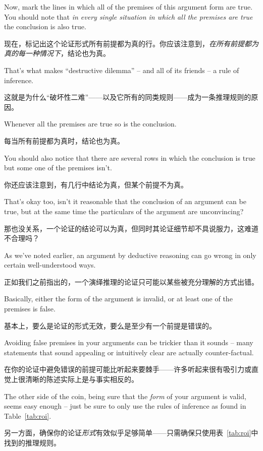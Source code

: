 Now, mark the lines in which all of the premises of this argument form 
are true.  You should note that {\em in every single situation in which 
all the premises are true} the conclusion is also true.

现在，标记出这个论证形式所有前提都为真的行。你应该注意到，{\em 在所有前提都为真的每一种情况下}，结论也为真。

That's what 
makes ``destructive dilemma'' -- and all of its friends -- a rule of 
inference.

这就是为什么“破坏性二难”——以及它所有的同类规则——成为一条推理规则的原因。

Whenever all the premises are true so is the conclusion.

每当所有前提都为真时，结论也为真。

You should also notice that there are several rows in which the 
conclusion is true but some one of the premises isn't.

你还应该注意到，有几行中结论为真，但某个前提不为真。

That's
okay too, isn't it reasonable that the conclusion of an argument 
can be true, but at the same time the particulars of the argument 
are unconvincing?

那也没关系，一个论证的结论可以为真，但同时其论证细节却不具说服力，这难道不合理吗？

As we've noted earlier, an argument by deductive reasoning can go wrong 
in only certain well-understood ways.

正如我们之前指出的，一个演绎推理的论证只可能以某些被充分理解的方式出错。

Basically, either the form of the 
argument is invalid, or at least one of the premises is false.

基本上，要么是论证的形式无效，要么是至少有一个前提是错误的。

Avoiding 
false premises in your arguments can be trickier than it sounds -- many 
statements that sound appealing or intuitively clear are actually
counter-factual.

在你的论证中避免错误的前提可能比听起来要棘手——许多听起来很有吸引力或直觉上很清晰的陈述实际上是与事实相反的。

The other side of the coin, being sure that the 
\emph{form} 
of your argument is valid, seems easy enough -- just be 
sure to only use the rules of inference as found in Table~\ref{tab:roi}.

另一方面，确保你的论证\emph{形式}有效似乎足够简单——只需确保只使用表~\ref{tab:roi}中找到的推理规则。

